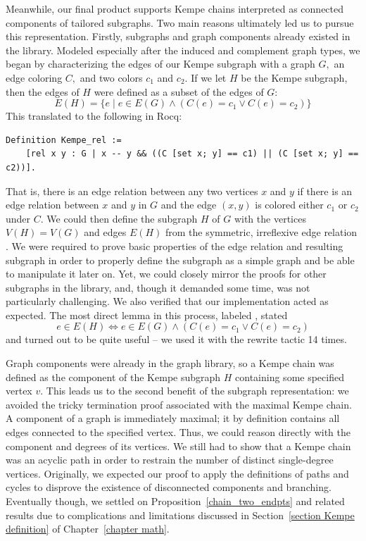 Meanwhile, our final product supports Kempe chains interpreted as connected components of tailored subgraphs. Two main reasons ultimately led us to pursue this representation. Firstly, subgraphs and graph components already existed in the library. Modeled especially after the induced and complement graph types, we began by characterizing the edges of our Kempe subgraph with a graph $G,$ an edge coloring $C,$ and two colors $c_1$ and $c_2.$ If we let $H$ be the Kempe subgraph, then the edges of $H$ were defined as a subset of the edges of $G:$ 
$$
E(H) = \{e \mid e \in E(G) \wedge (C(e) = c_1 \vee C(e) = c_2)\}
$$
This translated to the following in Rocq:
\begin{verbatim}
Definition Kempe_rel := 
    [rel x y : G | x -- y && ((C [set x; y] == c1) || (C [set x; y] == c2))].
\end{verbatim}
That is, there is an edge relation between any two vertices $x$ and $y$ if there is an edge relation between $x$ and $y$ in $G$ and the edge $(x, y)$ is colored either $c_1$ or $c_2$ under $C.$ We could then define the subgraph $H$ of $G$ with the vertices $V(H) = V(G)$ and edges $E(H)$ from the symmetric, irreflexive edge relation . We were required to prove basic properties of the edge relation and resulting subgraph in order to properly define the subgraph as a simple graph and be able to manipulate it later on. Yet, we could closely mirror the proofs for other subgraphs in the library, and, though it demanded some time, was not particularly challenging. We also verified that our implementation acted as expected. The most direct lemma in this process, labeled , stated $$e \in E(H) \iff e \in E(G) \wedge (C(e) = c_1 \vee C(e) = c_2)$$ and turned out to be quite useful -- we used it with the rewrite tactic 14 times. 

Graph components were already in the graph library, so a Kempe chain was defined as the component of the Kempe subgraph $H$ containing some specified vertex $v.$ This leads us to the second benefit of the subgraph representation: we avoided the tricky termination proof associated with the maximal Kempe chain. A component of a graph is immediately maximal; it by definition contains all edges connected to the specified vertex. Thus, we could reason directly with the component and degrees of its vertices. We still had to show that a Kempe chain was an acyclic path in order to restrain the number of distinct single-degree vertices. Originally, we expected our proof to apply the definitions of paths and cycles to disprove the existence of disconnected components and branching. Eventually though, we settled on Proposition~\ref{chain_two_endpts} and related results due to complications and limitations discussed in Section~\ref{section Kempe definition} of Chapter~\ref{chapter math}.


